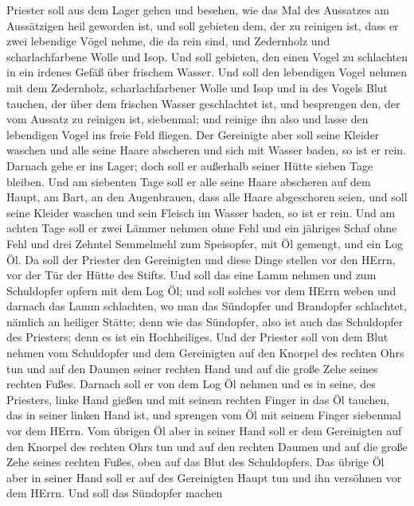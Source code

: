 Priester soll aus dem Lager gehen und besehen, wie das Mal des Aussatzes
am Aussätzigen heil geworden ist,  und soll gebieten dem,
der zu reinigen ist, dass er zwei lebendige Vögel nehme, die da rein
sind, und Zedernholz und scharlachfarbene Wolle und Isop. 
Und soll gebieten, den einen Vogel zu schlachten in ein irdenes Gefäß
über frischem Wasser.  Und soll den lebendigen Vogel nehmen
mit dem Zedernholz, scharlachfarbener Wolle und Isop und in des Vogels
Blut tauchen, der über dem frischen Wasser geschlachtet ist,
 und besprengen den, der vom Aussatz zu reinigen ist,
siebenmal; und reinige ihn also und lasse den lebendigen Vogel ins freie
Feld fliegen.  Der Gereinigte aber soll seine Kleider
waschen und alle seine Haare abscheren und sich mit Wasser baden, so ist
er rein. Darnach gehe er ins Lager; doch soll er außerhalb seiner Hütte
sieben Tage bleiben.  Und am siebenten Tage soll er alle
seine Haare abscheren auf dem Haupt, am Bart, an den Augenbrauen, dass
alle Haare abgeschoren seien, und soll seine Kleider waschen und sein
Fleisch im Wasser baden, so ist er rein.  Und am achten
Tage soll er zwei Lämmer nehmen ohne Fehl und ein jähriges Schaf ohne
Fehl und drei Zehntel Semmelmehl zum Speisopfer, mit Öl gemengt, und ein
Log Öl.  Da soll der Priester den Gereinigten und diese
Dinge stellen vor den HErrn, vor der Tür der Hütte des Stifts.
 Und soll das eine Lamm nehmen und zum Schuldopfer opfern
mit dem Log Öl; und soll solches vor dem HErrn weben  und
darnach das Lamm schlachten, wo man das Sündopfer und Brandopfer
schlachtet, nämlich an heiliger Stätte; denn wie das Sündopfer, also ist
auch das Schuldopfer des Priesters; denn es ist ein Hochheiliges.
 Und der Priester soll von dem Blut nehmen vom Schuldopfer
und dem Gereinigten auf den Knorpel des rechten Ohrs tun und auf den
Daumen seiner rechten Hand und auf die große Zehe seines rechten Fußes.
 Darnach soll er von dem Log Öl nehmen und es in seine, des
Priesters, linke Hand gießen  und mit seinem rechten Finger
in das Öl tauchen, das in seiner linken Hand ist, und sprengen vom Öl
mit seinem Finger siebenmal vor dem HErrn.  Vom übrigen Öl
aber in seiner Hand soll er dem Gereinigten auf den Knorpel des rechten
Ohrs tun und auf den rechten Daumen und auf die große Zehe seines
rechten Fußes, oben auf das Blut des Schuldopfers.  Das
übrige Öl aber in seiner Hand soll er auf des Gereinigten Haupt tun und
ihn versöhnen vor dem HErrn.  Und soll das Sündopfer machen
